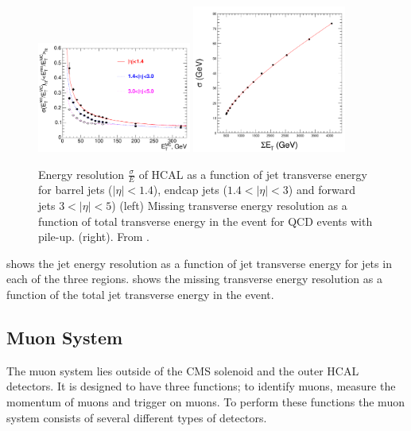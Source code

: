 \begin{figure}[htp]
  \centering
  \includegraphics[width=0.45\textwidth]{hcal_performance}
  \includegraphics[width=0.45\textwidth]{met_res}
  \caption{Energy resolution $\frac{\sigma}{E}$ of HCAL as a function of jet
  \label{fig:HCAL}
transverse energy for barrel jets ($|\eta| < 1.4$), endcap jets ($1.4<|\eta| <
3$) and forward jets $3<|\eta| < 5$) (left)
Missing transverse energy resolution as a function of total transverse energy in
the event for QCD events with pile-up. (right). From \cite{cms}.}
\end{figure}

 shows the jet energy resolution as a function of jet
transverse energy for jets in each of the three regions. 
shows the missing transverse energy resolution as a function of the total jet
transverse energy in the event.

\subsection{Muon System}
The muon system lies outside of the CMS solenoid and the outer HCAL detectors.
It is designed to have three functions; to identify muons, measure the momentum
of muons and trigger on muons. To perform these functions the muon system
consists of several different types of detectors.

